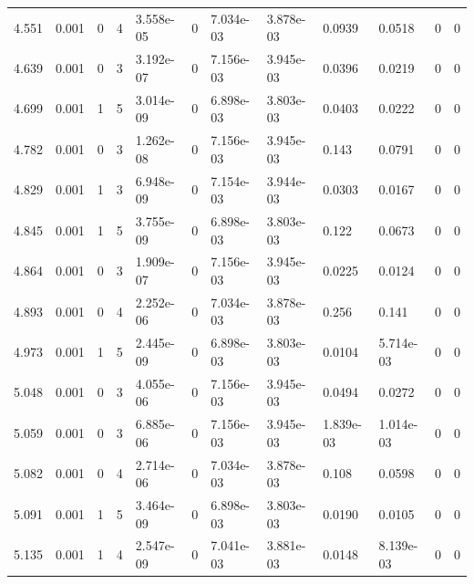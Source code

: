 \documentclass[preview]{standalone}
\begin{document}
{{{\begin{tabular}{L{1.2cm}C{1.2cm} C{0.3cm}C{0.5cm} C{1.4cm}C{1.4cm} C{1.4cm}C{1.4cm} C{1.6cm}C{1.6cm} C{1.6cm}C{1.6cm}}
  4.551  &  0.001  & 0     &  4 &  3.558e-05  & 0  &  7.034e-03&   3.878e-03& 0.0939 & 0.0518   &  0 & 0  \\ 
  4.639  &  0.001  & 0     &  3 &  3.192e-07  & 0  &  7.156e-03&   3.945e-03& 0.0396 & 0.0219   &  0 & 0  \\ 
  4.699  &  0.001  & 1     &  5 &  3.014e-09  & 0  &  6.898e-03&   3.803e-03& 0.0403 & 0.0222   &  0 & 0  \\ 
  4.782  &  0.001  & 0     &  3 &  1.262e-08  & 0  &  7.156e-03&   3.945e-03& 0.143 & 0.0791   &  0 & 0  \\ 
  4.829  &  0.001  & 1     &  3 &  6.948e-09  & 0  &  7.154e-03&   3.944e-03& 0.0303 & 0.0167   &  0 & 0  \\ 
  4.845  &  0.001  & 1     &  5 &  3.755e-09  & 0  &  6.898e-03&   3.803e-03& 0.122 & 0.0673   &  0 & 0  \\ 
  4.864  &  0.001  & 0     &  3 &  1.909e-07  & 0  &  7.156e-03&   3.945e-03& 0.0225 & 0.0124   &  0 & 0  \\ 
  4.893  &  0.001  & 0     &  4 &  2.252e-06  & 0  &  7.034e-03&   3.878e-03& 0.256 & 0.141   &  0 & 0  \\ 
  4.973  &  0.001  & 1     &  5 &  2.445e-09  & 0  &  6.898e-03&   3.803e-03& 0.0104 & 5.714e-03   &  0 & 0  \\ 
  5.048  &  0.001  & 0     &  3 &  4.055e-06  & 0  &  7.156e-03&   3.945e-03& 0.0494 & 0.0272   &  0 & 0  \\ 
  5.059  &  0.001  & 0     &  3 &  6.885e-06  & 0  &  7.156e-03&   3.945e-03& 1.839e-03 & 1.014e-03   &  0 & 0  \\ 
  5.082  &  0.001  & 0     &  4 &  2.714e-06  & 0  &  7.034e-03&   3.878e-03& 0.108 & 0.0598   &  0 & 0  \\ 
  5.091  &  0.001  & 1     &  5 &  3.464e-09  & 0  &  6.898e-03&   3.803e-03& 0.0190 & 0.0105   &  0 & 0  \\ 
  5.135  &  0.001  & 1     &  4 &  2.547e-09  & 0  &  7.041e-03&   3.881e-03& 0.0148 & 8.139e-03   &  0 & 0  \\ 
\hline 
\end{tabular} 

}}}
\end{document}
